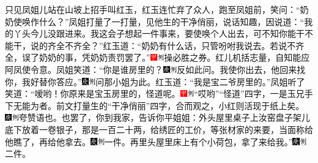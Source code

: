 只见凤姐儿站在山坡上招手叫红玉，红玉连忙弃了众人，跑至凤姐前，笑问：``奶奶使唤作什么？''凤姐打量了一打量，见他生的干净俏丽，说话知趣，因说道：``我的丫头今儿没跟进来。我这会子想起一件事来，要使唤个人出去，可不知你能干不能干，说的齐全不齐全？''红玉道：``奶奶有什么话，只管吩咐我说去。若说不齐全，误了奶奶的事，凭奶奶责罚罢了。''{\includegraphics[width=3mm]{../Images/00002}\includegraphics[width=3mm]{../Images/00011}\footnotesize \kaishu 操必胜之券。红儿机括志量，自知能应阿凤使令意。}凤姐笑道：``你是谁房里的？{\includegraphics[width=3mm]{../Images/00004}\includegraphics[width=3mm]{../Images/00011}\footnotesize \kaishu 反如此问。}我使你出去，他回来找你，我好替你答应。''{\includegraphics[width=3mm]{../Images/00004}\includegraphics[width=3mm]{../Images/00011}\footnotesize \kaishu 问那小姐为此。}红玉道：``我是宝二爷房里的。''凤姐听了笑道：``嗳哟！你原来是宝玉房里的，怪道呢。{\includegraphics[width=3mm]{../Images/00002}\includegraphics[width=3mm]{../Images/00011}\footnotesize \kaishu ``哎哟''``怪道''四字，一是玉兄手下无能为者。前文打量生的``干净俏丽''四字，合而观之，小红则活现于纸上矣。　\includegraphics[width=3mm]{../Images/00004}\includegraphics[width=3mm]{../Images/00011}\footnotesize \kaishu 夸赞语也。}也罢了，你到我家，告诉你平姐姐：外头屋里桌子上汝窑盘子架儿底下放着一卷银子，那是一百二十两，给绣匠的工价，等张材家的来要，当面称给他瞧了，再给他拿去。{\includegraphics[width=3mm]{../Images/00004}\includegraphics[width=3mm]{../Images/00011}\footnotesize \kaishu 一件。}再里头屋里床上有个小荷包，拿了来给我。''{\includegraphics[width=3mm]{../Images/00004}\includegraphics[width=3mm]{../Images/00011}\footnotesize \kaishu 二件。}

